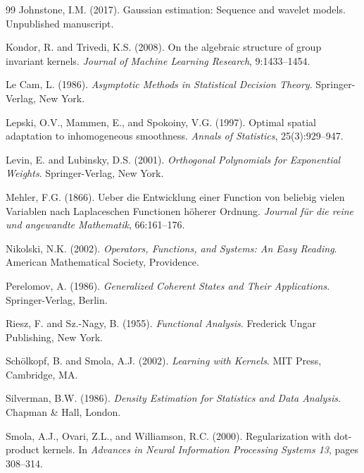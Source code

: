 \documentclass[11pt,a4paper]{article}
\begin{document}
\begin{thebibliography}{99}
Johnstone, I.M. (2017).
\newblock Gaussian estimation: Sequence and wavelet models.
\newblock Unpublished manuscript.

Kondor, R. and Trivedi, K.S. (2008).
\newblock On the algebraic structure of group invariant kernels.
\newblock \emph{Journal of Machine Learning Research}, 9:1433--1454.

Le Cam, L. (1986).
\newblock \emph{Asymptotic Methods in Statistical Decision Theory}.
\newblock Springer-Verlag, New York.

Lepski, O.V., Mammen, E., and Spokoiny, V.G. (1997).
\newblock Optimal spatial adaptation to inhomogeneous smoothness.
\newblock \emph{Annals of Statistics}, 25(3):929--947.

Levin, E. and Lubinsky, D.S. (2001).
\newblock \emph{Orthogonal Polynomials for Exponential Weights}.
\newblock Springer-Verlag, New York.

Mehler, F.G. (1866).
\newblock Ueber die Entwicklung einer Function von beliebig vielen Variablen nach Laplaceschen Functionen h\"oherer Ordnung.
\newblock \emph{Journal f\"ur die reine und angewandte Mathematik}, 66:161--176.

Nikolski, N.K. (2002).
\newblock \emph{Operators, Functions, and Systems: An Easy Reading}.
\newblock American Mathematical Society, Providence.

Perelomov, A. (1986).
\newblock \emph{Generalized Coherent States and Their Applications}.
\newblock Springer-Verlag, Berlin.

Riesz, F. and Sz.-Nagy, B. (1955).
\newblock \emph{Functional Analysis}.
\newblock Frederick Ungar Publishing, New York.

Sch\"olkopf, B. and Smola, A.J. (2002).
\newblock \emph{Learning with Kernels}.
\newblock MIT Press, Cambridge, MA.

Silverman, B.W. (1986).
\newblock \emph{Density Estimation for Statistics and Data Analysis}.
\newblock Chapman \& Hall, London.

Smola, A.J., Ovari, Z.L., and Williamson, R.C. (2000).
\newblock Regularization with dot-product kernels.
\newblock In \emph{Advances in Neural Information Processing Systems 13}, pages 308--314.


\end{thebibliography}
\end{document}
